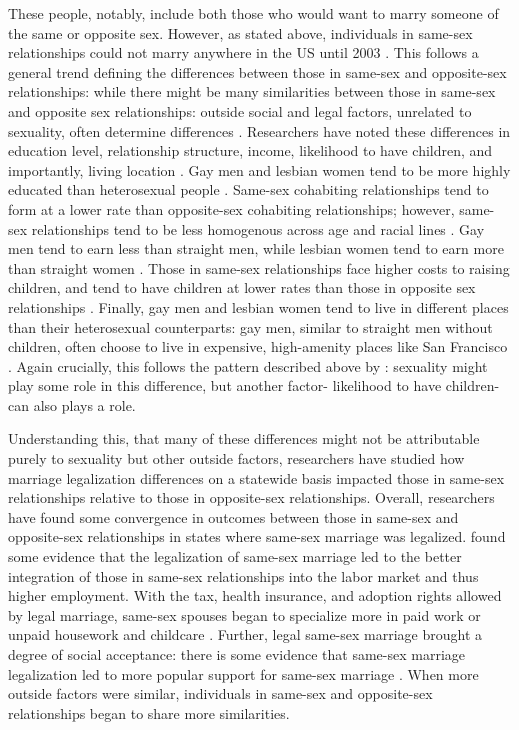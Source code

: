\documentclass[12pt,letterpaper]{article}
\begin{document}
These people, notably, include both those who would want to marry someone of the same or opposite sex. However, as stated above, individuals in same-sex relationships could not marry anywhere in the US until 2003 \citep{1, 3, 5, 12}. This follows a general trend defining the differences between those in same-sex and opposite-sex relationships: while there might be many similarities between those in same-sex and opposite sex relationships: outside social and legal factors, unrelated to sexuality, often determine differences \citep{2}. Researchers have noted these differences in education level, relationship structure, income, likelihood to have children, and importantly, living location \citep{2, 11, 6, 7, 8, 10, 7}. Gay men and lesbian women tend to be more highly educated than heterosexual people \citep{2, 7, 11}. Same-sex cohabiting relationships tend to form at a lower rate than opposite-sex cohabiting relationships; however, same-sex relationships tend to be less homogenous across age and racial lines \citep{2, 7}. Gay men tend to earn less than straight men, while lesbian women tend to earn more than straight women \citep{6}. Those in same-sex relationships face higher costs to raising children, and tend to have children at lower rates than those in opposite sex relationships \citep{8, 10, 11}. Finally, gay men and lesbian women tend to live in different places than their heterosexual counterparts: gay men, similar to straight men without children, often choose to live in expensive, high-amenity places like San Francisco \citep{7, 10, 11, 13}. Again crucially, this follows the pattern described above by \citet{2}: sexuality might play some role in this difference, but another factor- likelihood to have children- can also plays a role.

Understanding this, that many of these differences might not be attributable purely to sexuality but other outside factors, researchers have studied how marriage legalization differences on a statewide basis impacted those in same-sex relationships relative to those in opposite-sex relationships. Overall, researchers have found some convergence in outcomes between those in same-sex and opposite-sex relationships in states where same-sex marriage was legalized. \citep{3} found some evidence that the legalization of same-sex marriage led to the better integration of those in same-sex relationships into the labor market and thus higher employment. With the tax, health insurance, and adoption rights allowed by legal marriage, same-sex spouses began to specialize more in paid work or unpaid housework and childcare \citep{3, 4, 6}. Further, legal same-sex marriage brought a degree of social acceptance: there is some evidence that same-sex marriage legalization led to more popular support for same-sex marriage \citep{3, 21}. When more outside factors were similar, individuals in same-sex and opposite-sex relationships began to share more similarities.
\end{document}
